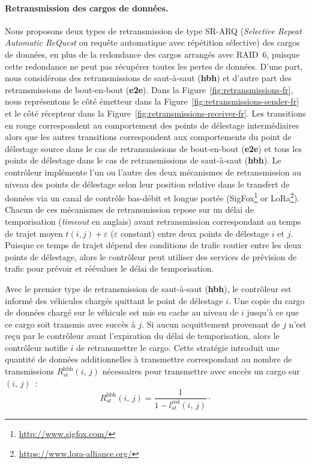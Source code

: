 \paragraph{Retransmission des cargos de données.} 
Nous proposons deux types de retransmission de type SR-ARQ (\textit{Selective Repeat Automatic ReQuest} ou requête automatique avec répétition sélective) des cargos de données, en plus de la redondance des cargos arrangés avec RAID~6, puisque cette redondance ne peut pas récupérer toutes les pertes de données. D’une part, nous considérons des retransmissions de saut-à-saut (\textbf{hbh}) et d’autre part des retransmissions de bout-en-bout (\textbf{e2e}). Dans la Figure~\ref{fig:retransmissions-fr}, nous représentons le côté émetteur dans la Figure~\ref{fig:retransmissions-sender-fr} et le côté récepteur dans la Figure~\ref{fig:retransmissions-receiver-fr}. Les transitions en rouge correspondent au comportement des points de délestage intermédiaires alors que les autres transitions correspondent aux comportements du point de délestage source dans le cas de retransmissions de bout-en-bout (\textbf{e2e}) et tous les points de délestage dans le cas de retransmissions de saut-à-saut (\textbf{hbh}). Le contrôleur implémente l’un ou l’autre des deux mécanismes de retransmission au niveau des points de délestage selon leur position relative dans le transfert de données via un canal de contrôle bas-débit et longue portée  (\eg SigFox\footnote{\url{http://www.sigfox.com/}} or LoRa\footnote{\url{https://www.lora-alliance.org/}}). Chacun de ces mécanismes de retransmission repose sur un délai de temporisation (\textit{timeout} en anglais) avant retransmission correspondant au temps de trajet moyen $t(i,j)+\varepsilon$ ($\varepsilon$ constant) entre deux points de délestage $i$ et $j$. Puisque ce temps de trajet dépend des conditions de trafic routier entre les deux points de délestage, alors le contrôleur peut utiliser des services de prévision de trafic pour prévoir et réévaluer le délai de temporisation. 
 
 
Avec le premier type de retransmission de saut-à-saut (\textbf{hbh}), le contrôleur est informé des véhicules chargés quittant le point de délestage $i$. Une copie du cargo de données chargé sur le véhicule est mis en cache au niveau de $i$ jusqu’à ce que ce cargo soit transmis avec succès à $j$. Si aucun acquittement provenant de $j$ n’est reçu par le contrôleur avant l’expiration du délai de temporisation, alors le contrôleur notifie $i$ de retransmettre le cargo. Cette stratégie introduit une quantité de données additionnelles à transmettre correspondant au nombre de transmissions $R^{\textrm{hbh}}_{st}(i,\,j)$ nécessaires pour transmettre avec succès un cargo sur $(i,\,j)$~: 
\begin{equation} 
    R_{st}^{\textrm{hbh}}(i,\,j) =  \frac{1}{1-l_{st}^{\text{red}}(i,\,j)}\cdot 
\end{equation} 
 
